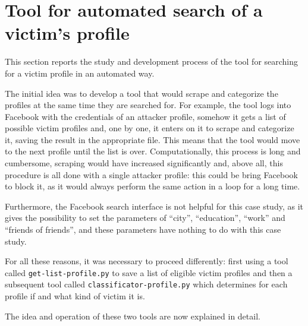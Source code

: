 \section{Tool for automated search of a victim's profile}
This section reports the study and development process of the tool for searching for a victim profile in an automated way.\par \noindent 
The initial idea was to develop a tool that would scrape and categorize the profiles at the same time they are searched for. For example, the tool logs into Facebook with the credentials of an attacker profile, somehow it gets a list of possible victim profiles and, one by one, it enters on it to scrape and categorize it, saving the result in the appropriate file. This means that the tool would move to the next profile until the list is over. Computationally, this process is long and cumbersome, scraping would have increased significantly and, above all, this procedure is all done with a single attacker profile: this could be bring Facebook to block it, as it would always perform the same action in a loop for a long time.
\par \noindent Furthermore, the Facebook search interface is not helpful for this case study, as it gives the possibility to set the parameters of ``city'', ``education'', ``work'' and ``friends of friends'', and these parameters have nothing to do with this case study. \par \noindent 
For all these reasons, it was necessary to proceed differently: first using a tool called \texttt{get-list-profile.py} to save a list of eligible victim profiles and then a subsequent tool called \texttt{classificator-profile.py} which determines for each profile if and what kind of victim it is.
\par \noindent The idea and operation of these two tools are now explained in detail.

